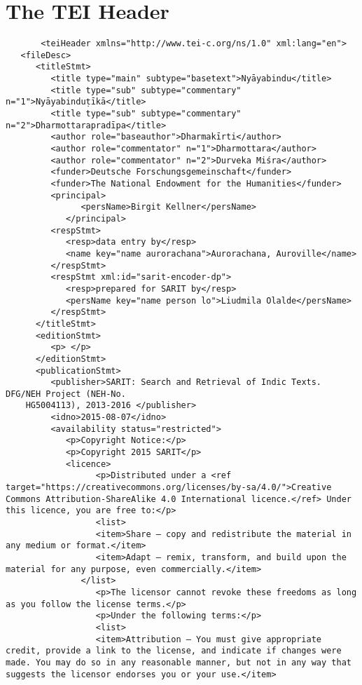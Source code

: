 \documentclass[article,12pt,a4paper]{memoir}
\begin{document}
	 \chapter{The TEI Header}
	 \begin{verbatim}
       <teiHeader xmlns="http://www.tei-c.org/ns/1.0" xml:lang="en">
   <fileDesc>
      <titleStmt>
         <title type="main" subtype="basetext">Nyāyabindu</title>
         <title type="sub" subtype="commentary" n="1">Nyāyabinduṭīkā</title>
         <title type="sub" subtype="commentary" n="2">Dharmottarapradīpa</title>
         <author role="baseauthor">Dharmakīrti</author>
         <author role="commentator" n="1">Dharmottara</author>
         <author role="commentator" n="2">Durveka Miśra</author>
         <funder>Deutsche Forschungsgemeinschaft</funder>
         <funder>The National Endowment for the Humanities</funder>
         <principal>
	           <persName>Birgit Kellner</persName>
	        </principal>
         <respStmt>
            <resp>data entry by</resp>
            <name key="name aurorachana">Aurorachana, Auroville</name>
         </respStmt>
         <respStmt xml:id="sarit-encoder-dp">
            <resp>prepared for SARIT by</resp>
            <persName key="name person lo">Liudmila Olalde</persName>
         </respStmt>
      </titleStmt>
      <editionStmt>
         <p> </p>
      </editionStmt>
      <publicationStmt>
         <publisher>SARIT: Search and Retrieval of Indic Texts. DFG/NEH Project (NEH-No.
	HG5004113), 2013-2016 </publisher>
         <idno>2015-08-07</idno>
         <availability status="restricted">
            <p>Copyright Notice:</p>
            <p>Copyright 2015 SARIT</p>
            <licence> 
	              <p>Distributed under a <ref target="https://creativecommons.org/licenses/by-sa/4.0/">Creative Commons Attribution-ShareAlike 4.0 International licence.</ref> Under this licence, you are free to:</p>
	              <list>
                  <item>Share — copy and redistribute the material in any medium or format.</item>
                  <item>Adapt — remix, transform, and build upon the material for any purpose, even commercially.</item>
               </list>
	              <p>The licensor cannot revoke these freedoms as long as you follow the license terms.</p>
	              <p>Under the following terms:</p>
	              <list>
                  <item>Attribution — You must give appropriate credit, provide a link to the license, and indicate if changes were made. You may do so in any reasonable manner, but not in any way that suggests the licensor endorses you or your use.</item>

\end{verbatim}
\end{document}
